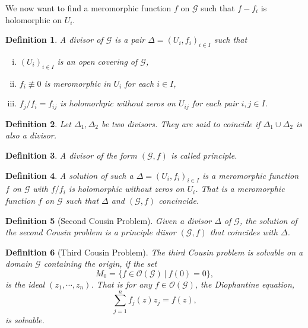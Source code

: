 \documentclass{article}
\newtheorem{definition}{Definition}[section]
\newcommand{\G}[0]{\mathcal{G}}
\newcommand{\sep}[0]{\:|\:}
\newcommand{\Ouv}[0]{\mathcal{O}}
\begin{document}
We now want to find a meromorphic function $f$ on $\G$ such that $f-f_i$ is holomorphic on $U_i$.

\begin{definition}
  A divisor of $\G$ is a pair $\Delta=(U_i,f_i)_{i\in I}$ such that 
  \begin{enumerate}[i).]
    \item $(U_i)_{i\in I}$ is an open covering of $\G$,
    \item $f_i\not\equiv0$ is meromorphic in $U_i$ for each $i\in I$,
    \item $f_j/f_i = f_{ij}$ is holomorhpic without zeros on $U_{ij}$ for each pair $i,j\in I$. 
  \end{enumerate}
\end{definition}

\begin{definition}
  Let $\Delta_1,\Delta_2$ be two divisors. They are said to coincide if $\Delta_1\cup\Delta_2$ is also a divisor. 
\end{definition}

\begin{definition}
  A divisor of the form $(\G,f)$ is called principle.
\end{definition}

\begin{definition}
  A solution of such a $\Delta=(U_i,f_i)_{i\in I}$ is a meromorphic function $f$ on $\G$ with $f/f_i$ is holomorphic without zeros on $U_i$. That is a meromorphic function $f$ on $\G$ such that $\Delta$ and $(\G,f)$ concincide.
\end{definition}

\begin{definition}[Second Cousin Problem]
  Given a divisor $\Delta$ of $\G$, the solution of the second Cousin problem is a principle diisor $(\G,f)$ that coincides with $\Delta$.
\end{definition}
  \begin{definition}[Third Cousin Problem]
    The third Cousin problem is solvable on a domain $\G$ containing the origin, if the set
    \begin{equation*}
      M_0 = \{f\in\Ouv(\G)\sep f(0)=0\},
    \end{equation*}
    is the ideal $(z_1,\cdots,z_n)$. That is for any $f\in\Ouv(\G)$, the Diophantine equation,
    \begin{equation*}
    \sum_{j=1}^n f_j(z)z_j = f(z),
  \end{equation*}
  is solvable.
  \end{definition}
\end{document}
